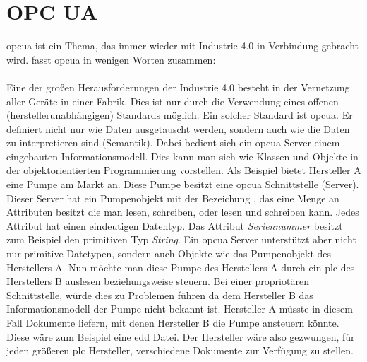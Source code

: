 \section{OPC UA}
\ac{opcua} ist ein Thema, das immer wieder mit Industrie 4.0 in Verbindung gebracht wird.
\citet{opcua:2018} fasst \acs{opcua} in wenigen  Worten zusammen:\\
\\
Eine der großen Herausforderungen der Industrie 4.0 besteht in der Vernetzung aller Geräte in einer Fabrik.
Dies ist nur durch die Verwendung eines offenen (herstellerunabhängigen) Standards möglich.
Ein solcher Standard ist \ac{opcua}. 
Er definiert nicht nur wie Daten ausgetauscht werden, 
sondern auch wie die Daten zu interpretieren sind (Semantik).
Dabei bedient sich ein \ac{opcua} Server einem eingebauten Informationsmodell. 
Dies kann man sich wie Klassen und Objekte in der objektorientierten Programmierung vorstellen.
Als Beispiel bietet Hersteller A eine Pumpe am Markt an. 
Diese Pumpe besitzt eine \ac{opcua} Schnittstelle (Server).
Dieser Server hat ein Pumpenobjekt mit der Bezeichung , das eine Menge an Attributen besitzt die man lesen, schreiben, oder lesen und schreiben kann.
Jedes Attribut hat einen eindeutigen Datentyp. 
Das Attribut \emph{Seriennummer} besitzt zum Beispiel den primitiven Typ \emph{String}.
Ein \ac{opcua} Server unterstützt aber nicht nur primitive Datetypen, 
sondern auch Objekte wie das Pumpenobjekt  des Herstellers A.
Nun möchte man diese Pumpe des Herstellers A durch ein \ac{plc} des Herstellers B auslesen beziehungsweise steuern.
Bei einer propriotären Schnittstelle, würde dies zu Problemen führen da dem Hersteller B das Informationsmodell der Pumpe nicht bekannt ist. 
Hersteller A müsste in diesem Fall Dokumente liefern, mit denen Hersteller B die Pumpe ansteuern könnte. Diese wäre zum Beispiel eine \ac{edd} Datei.
Der Hersteller wäre also gezwungen, für jeden größeren \ac{plc} Hersteller, verschiedene Dokumente zur Verfügung zu stellen.

